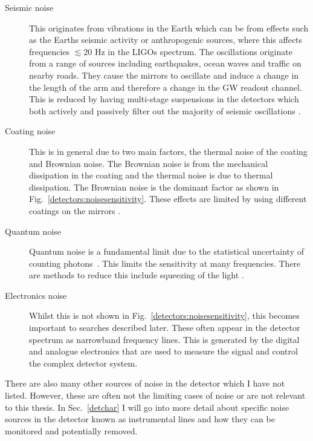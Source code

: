 \begin{description}
\item[Seismic noise] This originates from vibrations in the Earth which can be from effects such as the Earths seismic
activity or anthropogenic sources, where this affects frequencies $\lesssim 20$ Hz in the \glspl{LIGO} spectrum. The oscillations originate
from a range of sources including earthquakes, ocean waves and traffic on nearby roads. They cause the mirrors to
oscillate and induce a change
in the length of the arm and therefore a change in the \gls{GW} readout channel. This is reduced by having multi-stage suspensions in
the detectors which both actively and passively filter out the majority of seismic oscillations
\citep{matichard2015SeismicIsolation}.

\item[Coating noise] This is in general due to two main factors, the thermal
noise of the coating and Brownian noise. The Brownian noise is from the
mechanical dissipation in the coating and the thermal noise is due to thermal
dissipation. The Brownian noise is the dominant factor as shown in
Fig.~\ref{detectors:noisesensitivity}. These effects are limited by using
different coatings on the mirrors \citep{abernathy0OverviewResearch}.

\item[Quantum noise] Quantum noise is a fundamental limit due to the
statistical uncertainty of counting photons~.
This limits the sensitivity at many frequencies. There are methods to reduce
this include squeezing of the light \citep{aasi2013EnhancedSensitivity}. 

\item[Electronics noise ] Whilst this is not shown
in Fig.~\ref{detectors:noisesensitivity}, this becomes important to searches
described later. These often appear in the detector spectrum as narrowband frequency lines. This is generated by the digital and analogue
electronics that are used to measure the signal and control the complex
detector system.  
\end{description}

There are also many other sources of noise in the detector which I have not
listed. However, these are often not the limiting cases of noise or are not
relevant to this thesis.  In Sec.~\ref{detchar} I will go into more detail
about specific noise sources in the detector known as instrumental lines and
how they can be monitored and potentially removed.~ 












